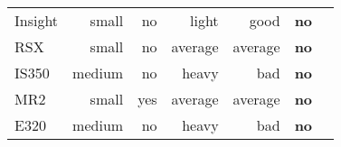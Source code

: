 \begin{table}[!htp]
\begin{tabular}{lrrrrrr}
        Insight        & small           & no                & light           & good              & \textbf{no}   \\
        RSX            & small           & no                & average         & average           & \textbf{no}   \\
        IS350          & medium          & no                & heavy           & bad               & \textbf{no}   \\
        MR2            & small           & yes               & average         & average           & \textbf{no}   \\
        E320           & medium          & no                & heavy           & bad               & \textbf{no}   \\
        \bottomrule
    \end{tabular}
\end{table}